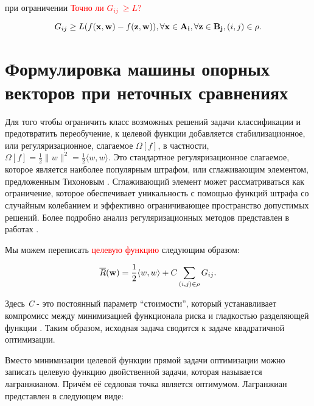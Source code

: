 \documentclass[12pt,a4paper,oneside]{article}
\begin{document}
\par
при ограничении \textcolor{red}{Точно ли \(G_{ij}\ \geq L\)?}

\[
G_{ij} \geq L ( f(\mathbf{x}, \mathbf{w}) - f(\mathbf{z}, \mathbf{w})), \forall \mathbf{x} \in \mathbf{A_i}, \forall \mathbf{z} \in \mathbf{B_j}, (i, j) \in \mathrm{\rho}.
\]


\section{Формулировка машины опорных векторов при неточных сравнениях}
\label{sec:svm_by_imprecise_comparisons}

\par
Для того чтобы ограничить класс возможных решений задачи классификации и предотвратить переобучение, к целевой функции добавляется стабилизационное, или регуляризационное, слагаемое \(\Omega[f]\), в частности, \(\Omega[f] = \frac{1}{2}\|w\|^2 = \frac{1}{2} \langle w, w \rangle \). 
Это стандартное регуляризационное слагаемое, которое является наиболее популярным штрафом, или сглаживающим элементом, предложенным Тихоновым . 
Сглаживающий элемент может рассматриваться как ограничение, которое обеспечивает уникальность с помощью функций штрафа со случайным колебанием и эффективно ограничивающее пространство допустимых решений. 
Более подробно анализ регуляризационных методов представлен в работах  . 

\par
Мы можем переписать \textcolor{red}{целевую функцию} следующим образом:

\[
\overline{R}(\mathbf{w}) = \frac{1}{2} \langle w, w \rangle + C \sum \limits_{(i, j) \in \mathrm{\rho}} G_{ij}. 
\]

\par
Здесь \emph{C} - это постоянный параметр ``стоимости'', который устанавливает компромисс между минимизацией функционала риска и гладкостью разделяющей функции . 
Таким образом, исходная задача сводится к задаче квадратичной оптимизации. 

\par
Вместо минимизации целевой функции прямой задачи оптимизации можно записать целевую функцию двойственной задачи, которая называется лагранжианом. 
Причём её седловая точка является оптимумом. 
Лагранжиан представлен в следующем виде:
\end{document}
